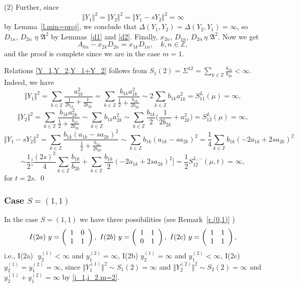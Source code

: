 \documentclass[preprint,12pt]{elsarticle}
\numberwithin{equation}{section}
\begin{document}
\begin{pf}
(2) Further, since 
\begin{equation}
\label{Y_1,Y_2,Y_1+Y_2}
\Vert Y_1 \Vert^2= \Vert Y_2 \Vert^2= \Vert Y_1 -sY_2 \Vert^2=\infty
\end{equation}
by Lemma~\ref{l.min=proj}, we conclude that $\Delta(Y_1,Y_2)=\Delta(Y_2,Y_1)=\infty$,
so $D_{1n},\,D_{2n}\,\,\eta\,\,{\mathfrak A}^2 $ by Lemmas~\ref{d1} and \ref{d2}.
Finally, $x_{2n},\,D_{1n},\,D_{2n}\,\eta\,\,{\mathfrak A}^2$. Now we get
$$
A_{kn}-x_{2k}D_{2n}=x_{1k}D_{1n},\quad k,n\in {\mathbb Z},
$$ 
%
and the proof is complete since
we are in the case $m=1$.

Relations \eqref{Y_1,Y_2,Y_1+Y_2} follows from 
$S_1(2)\!=\!\Sigma^{12}\!=\!\sum_{k\in \mathbb Z}\frac{b_{1k}}{b_{2k}}<\infty$. Indeed, we have
$$
\Vert Y_1\Vert^2=\sum_{k\in{\mathbb Z}}\frac{a_{1k}^2}{\frac{1}{2b_{1k}}+\frac{1}{2b_{2k}}}=
\sum_{k\in{\mathbb Z}}\frac{b_{1k}a_{1k}^2}{\frac{1}{2}+\frac{b_{1k}}{2b_{2k}}}\sim 2\sum_{k\in{\mathbb Z}}b_{1k}a_{1k}^2=
S^L_{11}(\mu)=\infty,
$$
$$
\Vert Y_2\Vert^2=
\sum_{k\in{\mathbb Z}}\frac{b_{1k}a_{2k}^2}{\frac{1}{2}+\frac{b_{1k}}{2b_{2k}}}\sim
\sum_{k\in{\mathbb Z}}b_{1k}a_{2k}^2\sim
 \sum_{k\in{\mathbb Z}}\frac{b_{1k}}{2}\Big(\frac{1}{2b_{2k}}+a_{2k}^2\Big)=S^L_{12}(\mu)=\infty,
$$
$$
\Vert Y_1-sY_2\Vert^2\!=\!\!\sum_{k\in{\mathbb Z}}\frac{b_{1k}(a_{1k}\!-\!s a_{2k})^2}{\frac{1}{2}+\frac{b_{1k}}{2b_{2k}}}\!\sim\!
\sum_{k\in{\mathbb Z}}b_{1k}(a_{1k}\!-\!s a_{2k})^2\!=\!\frac{1}{4}\sum_{k\in{\mathbb Z}}b_{1k}(-2a_{1k}+2sa_{2k})^2
$$
$$
\sim
\frac{1}{2}\Big[\frac{(2s)^2}{4}\sum_{k\in{\mathbb
Z}}\frac{b_{1k}}{b_{2k}}+ \sum_{k\in{\mathbb
Z}}\frac{b_{1k}}{2}(-2a_{1k}+2sa_{2k})^2\Big]
= \frac{1}{2}S^{L,-}_{12}(\mu,t)=\infty,
$$
for $t=2s$.
\qed\end{pf}
%
\subsubsection{Case  $S=(1,1)$}
%
In the case $S=(1,1)$ we have three possibilities (see Remark~\ref{r.(0,1)} )
%
\begin{equation}
\label{S=(1,1)}
{\rm I(2a)}\,\,y=\left(\begin{array}{cc}
1&0\\
1&1
\end{array}\right),\,\,
%
{\rm I(2b)}\,\,y=\left(\begin{array}{cc}
1&1\\
0&1
\end{array}\right),\,\,
{\rm I(2c)}\,\,y=\left(\begin{array}{cc}
1&1\\
1&1
\end{array}\right),
\end{equation}
i.e., {\rm I(2a)}\,\, $y_2^{(1)}<\infty$ and $y_1^{(2)}=\infty$,
{\rm I(2b)}\,\,$y_2^{(1)}=\infty$ and $y_1^{(2)}<\infty$,
{\rm I(2c)}\,\, $y_2^{(1)}=y_1^{(2)}=\infty$,
since $\Vert Y_1^{(1)}\Vert^2\sim S_1(2)=\infty$ and $\Vert Y_2^{(2)}\Vert^2\sim S_2(2)=\infty$
and  $y_2^{(1)}+y_1^{(2)}=\infty$ by \eqref{i_1,i_2.m=2}.
\end{document}
